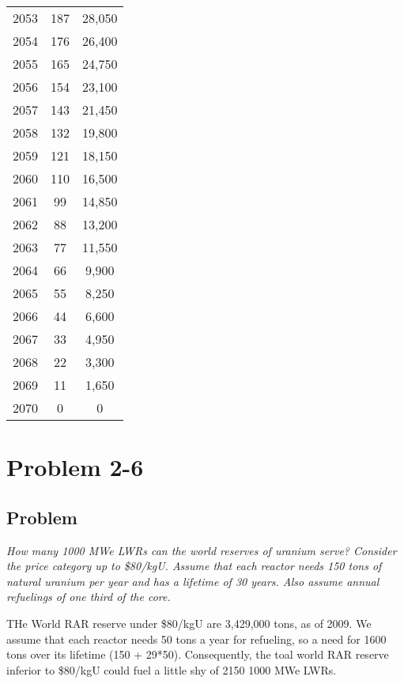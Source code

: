 {\begin{table}[]
\begin{tabular}{ccc}
2053                     & 187         & 28,050               \\
2054                     & 176         & 26,400               \\
2055                     & 165         & 24,750               \\
2056                     & 154         & 23,100               \\
2057                     & 143         & 21,450               \\
2058                     & 132         & 19,800               \\
2059                     & 121         & 18,150               \\
2060                     & 110         & 16,500               \\
2061                     & 99          & 14,850               \\
2062                     & 88          & 13,200               \\
2063                     & 77          & 11,550               \\
2064                     & 66          & 9,900                \\
2065                     & 55          & 8,250                \\
2066                     & 44          & 6,600                \\
2067                     & 33          & 4,950                \\
2068                     & 22          & 3,300                \\
2069                     & 11          & 1,650                \\
2070                     & 0           & 0                   
\end{tabular}
\end{table}}

\section{Problem 2-6}
\label{prob26}


\subsection{Problem}
\textit{How many 1000 MWe LWRs can the world reserves of uranium serve? Consider the price category up to \$80/kgU. Assume that each reactor needs 150 tons of natural uranium per year and has a lifetime of 30 years. Also assume annual refuelings of one third of the core.}

THe World RAR reserve under \$80/kgU are 3,429,000 tons, as of 2009. We assume that each reactor needs 50 tons a year for refueling, so a need for 1600 tons over its lifetime (150 + 29*50). Consequently, the toal world RAR reserve inferior to \$80/kgU could fuel a little shy of 2150 1000 MWe LWRs.
